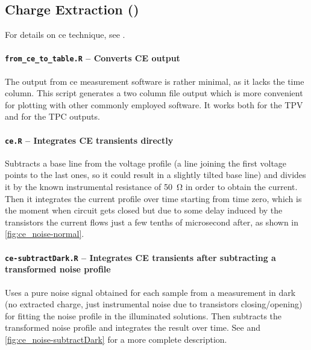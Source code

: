 

	\subsection{Charge Extraction ()}\label{r_ce}
	For details on \gls{ce} technique, see .

		\paragraph{\texttt{from\_ce\_to\_table.R} -- Converts CE output}
		The output from \gls{ce} measurement software is rather minimal, as it lacks the time column.
		This script generates a two column file output which is more convenient for plotting with other commonly employed software.
		It works both for the TPV and for the TPC outputs.
		
		\paragraph{\texttt{ce.R} -- Integrates CE transients directly}
		Subtracts a base line from the voltage profile (a line joining the first voltage points to the last ones, so it could result in a slightly tilted base line) and divides it by the known instrumental resistance of \SI{50}{\ohm} in order to obtain the current.
		Then it integrates the current profile over time starting from time zero, which is the moment when circuit gets closed but due to some delay induced by the transistors the current flows just a few tenths of microsecond after, as shown in \cref{fig:ce_noise-normal}.

		\paragraph{\texttt{ce-\-subtractDark.R} -- Integrates CE transients after subtracting a transformed noise profile}
		Uses a pure noise signal obtained for each sample from a measurement in dark (no extracted charge, just instrumental noise due to transistors closing/opening) for fitting the noise profile in the illuminated solutions.
		Then subtracts the transformed noise profile and integrates the result over time.
		See  and \cref{fig:ce_noise-subtractDark} for a more complete description.
		
